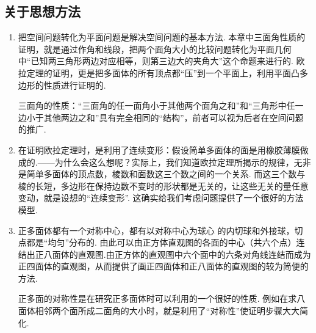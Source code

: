 \subsection*{关于思想方法}
\begin{enumerate}[(1)]
 
   \item 把空间问题转化为平面问题是解决空间问题的基本方法. 本章中三面角性质的证明，就是通过作角和线段，把两个面角大小的比较问题转化为平面几何中“已知两三角形两边对应相等，则第三边大的夹角大”这个命题来进行的. 欧拉定理的证明，更是把多面体的所有顶点都“压”到一个平面上，利用平面凸多边形的性质进行证明的.


三面角的性质：“三面角的任一面角小于其他两个面角之和”和“三角形中任一边小于其他两边之和”具有完全相同的“结构”，前者可以视为后者在空间问题的推广.

   \item 在证明欧拉定理时，是利用了连续变形：假设简单多面体的面是用橡胶薄膜做成的.——为什么会这么想呢？实际上，我们知道欧拉定理所揭示的规律，无非是简单多面体的顶点数，棱数和面数这三个数之间的一个关系. 而这三个数与棱的长短，多边形在保持边数不变时的形状都是无关的，让这些无关的量任意变动，就是设想的“连续变形”. 这确实给我们考虑问题提供了一个很好的方法模型.

   \item 正多面体都有一个对称中心，都有以对称中心为球心
   的内切球和外接球，切点都是“均匀”分布的. 由此可以由正方体直观图的各面的中心（共六个点）连结出正八面体的直观图.由正方体的直观图中六个面中的六条对角线连结而成为正四面体的直观图，从而提供了画正四面体和正八面体的直观图的较为简便的方法.

正多面的对称性是在研究正多面体时可以利用的一个很好的性质. 例如在求八面体相邻两个面所成二面角的大小时，就是利用了“对称性”使证明步骤大大简化.

\end{enumerate}


